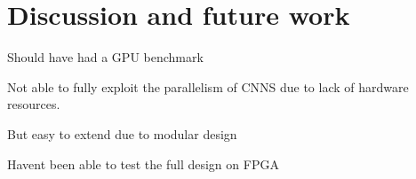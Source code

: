 \chapter{Discussion and future work}

Should have had a GPU benchmark

Not able to fully exploit the parallelism of CNNS due to lack of hardware resources.

But easy to extend due to modular design

Havent been able to test the full design on FPGA